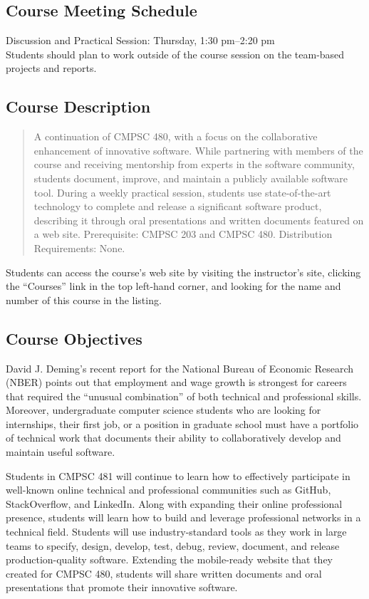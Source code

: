 \documentclass[11pt]{article}
\begin{document}
\subsection*{Course Meeting Schedule}

Discussion and Practical Session: Thursday, 1:30 pm--2:20 pm \\

\noindent Students should plan to work outside of the course session on the
team-based projects and reports.

\subsection*{Course Description}

\begin{quote}

A continuation of CMPSC 480, with a focus on the collaborative enhancement of
innovative software. While partnering with members of the course and receiving
mentorship from experts in the software community, students document, improve,
and maintain a publicly available software tool. During a weekly practical
session, students use state-of-the-art technology to complete and release a
significant software product, describing it through oral presentations and
written documents featured on a web site. Prerequisite: CMPSC 203 and CMPSC 480.
Distribution Requirements: None.

\end{quote}

\noindent Students can access the course's web site by visiting the instructor's
site, clicking the ``Courses'' link in the top left-hand corner, and looking for
the name and number of this course in the listing.

\subsection*{Course Objectives}

David J. Deming's recent report for the National Bureau of Economic Research
(NBER) points out that employment and wage growth is strongest for careers that
required the ``unusual combination'' of both technical and professional skills.
Moreover, undergraduate computer science students who are looking for
internships, their first job, or a position in graduate school must have a
portfolio of technical work that documents their ability to collaboratively
develop and maintain useful software.

Students in CMPSC 481 will continue to learn how to effectively participate in
well-known online technical and professional communities such as GitHub,
StackOverflow, and LinkedIn. Along with expanding their online professional
presence, students will learn how to build and leverage professional networks in
a technical field.
%
Students will use industry-standard tools as they work in large teams to
specify, design, develop, test, debug, review, document, and release
production-quality software.
%
Extending the mobile-ready website that they created for CMPSC 480, students
will share written documents and oral presentations that promote their
innovative software.
\end{document}
